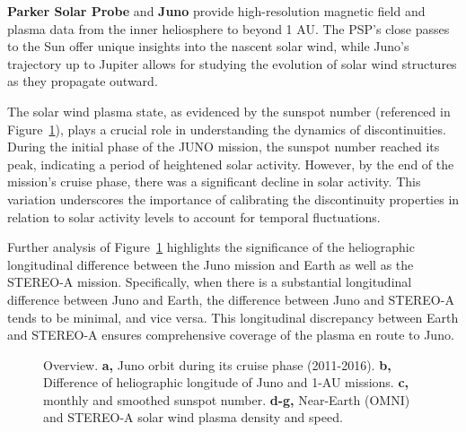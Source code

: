 \documentclass[
  letterpaper,
  DIV=11,
  numbers=noendperiod]{scrartcl}
\begin{document}
\textbf{Parker Solar Probe} and \textbf{Juno} provide high-resolution magnetic field and plasma data from the inner heliosphere to beyond 1 AU. The PSP's close passes to the Sun offer unique insights into the nascent solar wind, while Juno's trajectory up to Jupiter allows for studying the evolution of solar wind structures as they propagate outward.

The solar wind plasma state, as evidenced by the sunspot number (referenced in Figure~\ref{fig-overview}), plays a crucial role in understanding the dynamics of discontinuities. During the initial phase of the JUNO mission, the sunspot number reached its peak, indicating a period of heightened solar activity. However, by the end of the mission's cruise phase, there was a significant decline in solar activity. This variation underscores the importance of calibrating the discontinuity properties in relation to solar activity levels to account for temporal fluctuations.

Further analysis of Figure~\ref{fig-overview} highlights the significance of the heliographic longitudinal difference between the Juno mission and Earth as well as the STEREO-A mission. Specifically, when there is a substantial longitudinal difference between Juno and Earth, the difference between Juno and STEREO-A tends to be minimal, and vice versa. This longitudinal discrepancy between Earth and STEREO-A ensures comprehensive coverage of the plasma en route to Juno.

\begin{figure}


\caption{\label{fig-overview}Overview. \textbf{a,} Juno orbit during its cruise phase (2011-2016). \textbf{b,} Difference of heliographic longitude of Juno and 1-AU missions. \textbf{c,} monthly and smoothed sunspot number. \textbf{d-g,} Near-Earth (OMNI) and STEREO-A solar wind plasma density and speed.}

\end{figure}%
\end{document}

